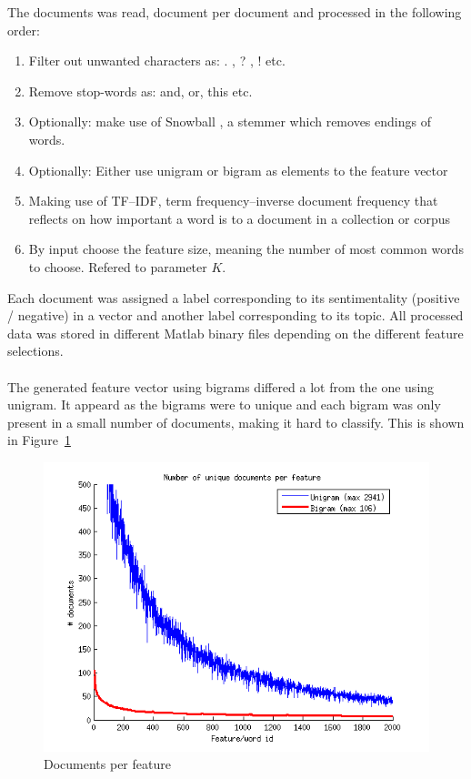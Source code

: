 The documents was read, document per document and processed in the following order: 
\begin{enumerate}
\item Filter out unwanted characters as: . , ? , ! etc.
\item Remove stop-words as: and, or, this etc.
\item Optionally: make use of Snowball \citep{snowball_url}, a stemmer which removes endings of words.
\item Optionally: Either use unigram or bigram as elements to the feature vector
\item Making use of TF–IDF, term frequency–inverse document frequency that
reflects on how important a word is to a document in a collection or corpus
\item By input choose the feature size, meaning the number of most common words to choose. Refered to parameter $K$.
\end{enumerate}
Each document was assigned a label corresponding to its sentimentality (positive / negative) in a vector and another label corresponding to its topic. All processed data was stored in different Matlab binary files depending on the different feature selections. 
\\\\
The generated feature vector using bigrams differed a lot from the one using unigram. It appeard as the bigrams were to unique and each bigram was only present in a small number of documents, making it hard to classify. This is shown in Figure~\ref{fig:docperfeature} 
\begin{figure}[h!]
\centering
\includegraphics[scale = 0.6]{fig/documents_per_feature.png}
\caption{Documents per feature}
\label{fig:docperfeature}
\end{figure} 

